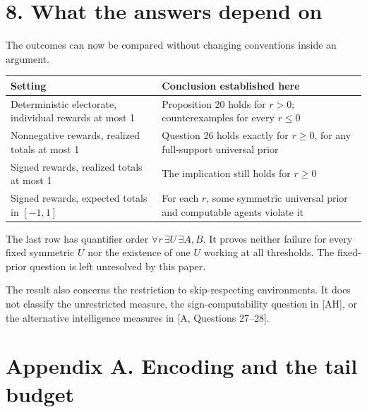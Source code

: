 \documentclass[
  11pt,
  letterpaper,
]{article}
\newcounter{none} %
\begin{document}
\section{8. What the answers depend
on}\label{what-the-answers-depend-on}

The outcomes can now be compared without changing conventions inside an
argument.

{\def\LTcaptype{none} %
\begin{longtable}[]{@{}
  >{\raggedright\arraybackslash}p{}
  >{\raggedright\arraybackslash}p{}@{}}
\toprule\noalign{}
\begin{minipage}[b]{\linewidth}\raggedright
Setting
\end{minipage} & \begin{minipage}[b]{\linewidth}\raggedright
Conclusion established here
\end{minipage} \\
\midrule\noalign{}
\endhead
\bottomrule\noalign{}
\endlastfoot
Deterministic electorate, individual rewards at most 1 & Proposition 20
holds for \(r>0\); counterexamples for every \(r\leq0\) \\
Nonnegative rewards, realized totals at most 1 & Question 26 holds
exactly for \(r\geq0\), for any full-support universal prior \\
Signed rewards, realized totals at most 1 & The implication still holds
for \(r\geq0\) \\
Signed rewards, expected totals in \([-1,1]\) & For each \(r\), some
symmetric universal prior and computable agents violate it \\
\end{longtable}
}

The last row has quantifier order \(\forall r\,\exists U\,\exists A,B\).
It proves neither failure for every fixed symmetric \(U\) nor the
existence of one \(U\) working at all thresholds. The fixed-prior
question is left unresolved by this paper.

The result also concerns the restriction to skip-respecting
environments. It does not classify the unrestricted measure, the
sign-computability question in {[}AH{]}, or the alternative intelligence
measures in {[}A, Questions 27--28{]}.

\section{Appendix A. Encoding and the tail
budget}\label{appendix-a.-encoding-and-the-tail-budget}
\end{document}
